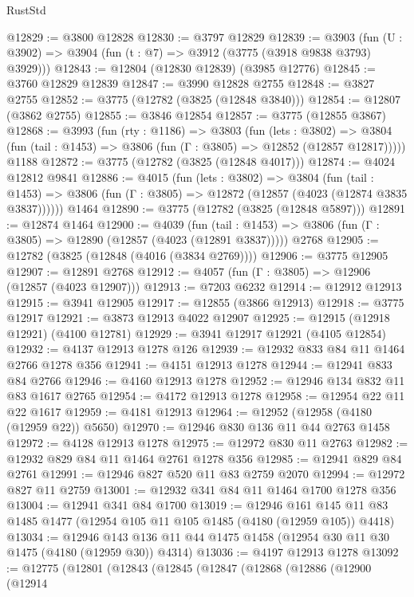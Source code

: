 \begin{lexlean}{RustStd}
\begin{coremodule}
@12829 := @3800 @12828
@12830 := @3797 @12829
@12839 := @3903 (fun (U : @3902) => @3904 (fun (t : @7) => @3912 (@3775 (@3918 @9838 @3793) @3929)))
@12843 := @12804 (@12830 @12839) (@3985 @12776)
@12845 := @3760 @12829 @12839
@12847 := @3990 @12828 @2755
@12848 := @3827 @2755
@12852 := @3775 (@12782 (@3825 (@12848 @3840)))
@12854 := @12807 (@3862 @2755)
@12855 := @3846 @12854
@12857 := @3775 (@12855 @3867)
@12868 := @3993
    (fun (rty : @1186) =>
    @3803
      (fun (lets : @3802) =>
      @3804 (fun (tail : @1453) => @3806 (fun (Γ : @3805) => @12852 (@12857 @12817)))))
    @1188
@12872 := @3775 (@12782 (@3825 (@12848 @4017)))
@12874 := @4024 @12812 @9841
@12886 := @4015
    (fun (lets : @3802) =>
    @3804
      (fun (tail : @1453) =>
      @3806 (fun (Γ : @3805) => @12872 (@12857 (@4023 (@12874 @3835 @3837))))))
    @1464
@12890 := @3775 (@12782 (@3825 (@12848 @5897)))
@12891 := @12874 @1464
@12900 := @4039
    (fun (tail : @1453) => @3806 (fun (Γ : @3805) => @12890 (@12857 (@4023 (@12891 @3837)))))
    @2768
@12905 := @12782 (@3825 (@12848 (@4016 (@3834 @2769))))
@12906 := @3775 @12905
@12907 := @12891 @2768
@12912 := @4057 (fun (Γ : @3805) => @12906 (@12857 (@4023 @12907)))
@12913 := @7203 @6232
@12914 := @12912 @12913
@12915 := @3941 @12905
@12917 := @12855 (@3866 @12913)
@12918 := @3775 @12917
@12921 := @3873 @12913 @4022 @12907
@12925 := @12915 (@12918 @12921) (@4100 @12781)
@12929 := @3941 @12917 @12921 (@4105 @12854)
@12932 := @4137 @12913 @1278 @126
@12939 := @12932 @833 @84 @11 @1464 @2766 @1278 @356
@12941 := @4151 @12913 @1278
@12944 := @12941 @833 @84 @2766
@12946 := @4160 @12913 @1278
@12952 := @12946 @134 @832 @11 @83 @1617 @2765
@12954 := @4172 @12913 @1278
@12958 := @12954 @22 @11 @22 @1617
@12959 := @4181 @12913
@12964 := @12952 (@12958 (@4180 (@12959 @22)) @5650)
@12970 := @12946 @830 @136 @11 @44 @2763 @1458
@12972 := @4128 @12913 @1278
@12975 := @12972 @830 @11 @2763
@12982 := @12932 @829 @84 @11 @1464 @2761 @1278 @356
@12985 := @12941 @829 @84 @2761
@12991 := @12946 @827 @520 @11 @83 @2759 @2070
@12994 := @12972 @827 @11 @2759
@13001 := @12932 @341 @84 @11 @1464 @1700 @1278 @356
@13004 := @12941 @341 @84 @1700
@13019 := @12946
    @161
    @145
    @11
    @83
    @1485
    @1477
    (@12954 @105 @11 @105 @1485 (@4180 (@12959 @105)) @4418)
@13034 := @12946 @143 @136 @11 @44 @1475 @1458 (@12954 @30 @11 @30 @1475 (@4180 (@12959 @30)) @4314)
@13036 := @4197 @12913 @1278
@13092 := @12775
    (@12801
      (@12843
        (@12845
          (@12847
            (@12868
              (@12886
                (@12900
                  (@12914

\end{coremodule}
\end{lexlean}
